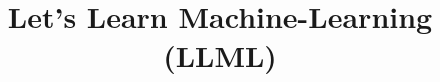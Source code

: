 \documentclass[xcolor=dvipsnames,compress,t,pdf,9pt]{beamer}
\title[\insertframenumber /\inserttotalframenumber]{Let's Learn Machine-Learning (LLML)}
\begin{document}
	\begin{frame}
	\titlepage
	\end{frame}

	
	
\end{document}
